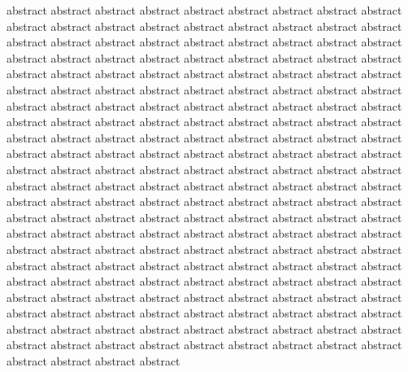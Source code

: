 abstract abstract
abstract abstract
abstract abstract
abstract abstract
abstract abstract
abstract abstract
abstract abstract
abstract abstract
abstract abstract
abstract abstract
abstract abstract
abstract abstract
abstract abstract
abstract abstract
abstract abstract
abstract abstract
abstract abstract
abstract abstract
abstract abstract
abstract abstract
abstract abstract
abstract abstract
abstract abstract
abstract abstract
abstract abstract
abstract abstract
abstract abstract
abstract abstract
abstract abstract
abstract abstract
abstract abstract
abstract abstract
abstract abstract
abstract abstract
abstract abstract
abstract abstract
abstract abstract
abstract abstract
abstract abstract
abstract abstract
abstract abstract
abstract abstract
abstract abstract
abstract abstract
abstract abstract
abstract abstract
abstract abstract
abstract abstract
abstract abstract
abstract abstract
abstract abstract
abstract abstract
abstract abstract
abstract abstract
abstract abstract
abstract abstract
abstract abstract
abstract abstract
abstract abstract
abstract abstract
abstract abstract
abstract abstract
abstract abstract
abstract abstract
abstract abstract
abstract abstract
abstract abstract
abstract abstract
abstract abstract
abstract abstract
abstract abstract
abstract abstract
abstract abstract
abstract abstract
abstract abstract
abstract abstract
abstract abstract
abstract abstract
abstract abstract
abstract abstract
abstract abstract
abstract abstract
abstract abstract
abstract abstract
abstract abstract
abstract abstract
abstract abstract
abstract abstract
abstract abstract
abstract abstract
abstract abstract
abstract abstract
abstract abstract
abstract abstract
abstract abstract
abstract abstract
abstract abstract
abstract abstract
abstract abstract
abstract abstract
abstract abstract
